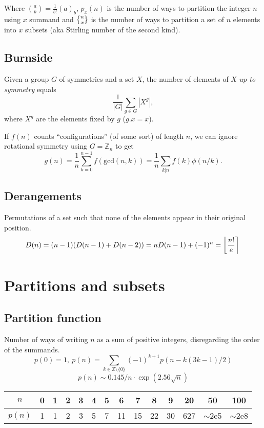   Where $\binom{a}{b} = \frac{1}{b!}(a)_b $, $p_x(n)$ is the number of ways to partition the integer $n$ using $x$ summand and $\stirlingsecond{n}{x}$ is the number of ways to partition a set of $n$ elements into $x$ subsets (aka Stirling number of the second kind).
	
\subsection{Burnside}
Given a group $G$ of symmetries and a set $X$, the number of elements of $X$ \emph{up to symmetry} equals
		 \[ {\frac {1}{|G|}}\sum _{{g\in G}}|X^{g}|, \]
		 where $X^{g}$ are the elements fixed by $g$ ($g.x = x$).

 If $f(n)$ counts ``configurations'' (of some sort) of length $n$, we can ignore rotational symmetry using $G = \mathbb Z_n$ to get
		 \[ g(n) = \frac 1 n \sum_{k=0}^{n-1}{f(\text{gcd}(n, k))} = \frac 1 n \sum_{k|n}{f(k)\phi(n/k)}. \]

\subsection{Derangements}

Permutations of a set such that none of the elements appear in their original position.
\small
\[ \mkern-2mu D(n) = (n-1)(D(n-1)+D(n-2)) = n D(n-1)+(-1)^n = \left\lfloor\frac{n!}{e}\right\rceil \]
\normalsize


\section{Partitions and subsets}

\subsection{Partition function}
	Number of ways of writing $n$ as a sum of positive integers, disregarding the order of the summands.
	\small
	\[ p(0) = 1,\ p(n) = \sum_{k \in \mathbb Z \setminus \{0\}}{(-1)^{k+1} p(n - k(3k-1) / 2)} \]
	\[ p(n) \sim 0.145 / n \cdot \exp(2.56 \sqrt{n}) \]

	\begin{center}
	\begin{tabular}{c|c@{\ }c@{\ }c@{\ }c@{\ }c@{\ }c@{\ }c@{\ }c@{\ }c@{\ }c@{\ }c@{\ }c@{\ }c}
		$n$    & 0 & 1 & 2 & 3 & 4 & 5 & 6  & 7  & 8  & 9  & 20  & 50  & 100 \\ \hline
		$p(n)$ & 1 & 1 & 2 & 3 & 5 & 7 & 11 & 15 & 22 & 30 & 627 & $\mathtt{\sim}$2e5 & $\mathtt{\sim}$2e8 \\
	\end{tabular}
	\end{center}
	\normalsize

